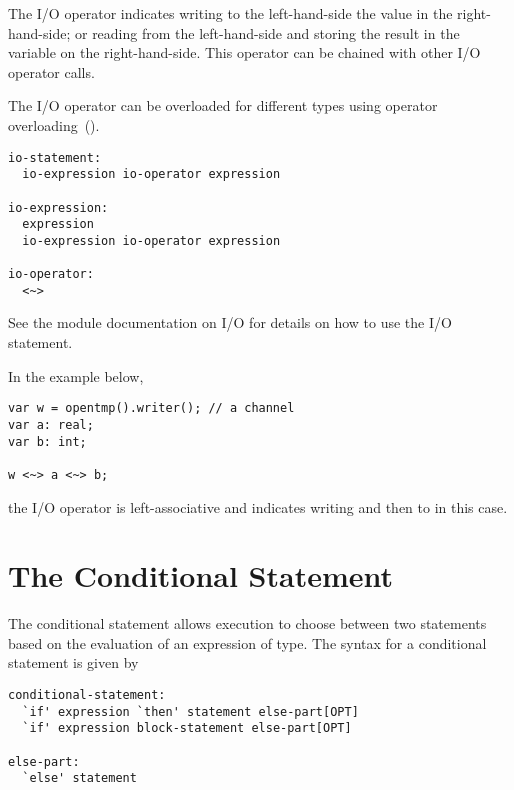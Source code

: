 The I/O operator indicates writing to the left-hand-side the value in the
right-hand-side; or reading from the left-hand-side and storing the result
in the variable on the right-hand-side. This operator can be chained with
other I/O operator calls.

The I/O operator can be overloaded for different types using operator
overloading~().
\begin{syntax}
\begin{verbatim}
io-statement:
  io-expression io-operator expression

io-expression:
  expression
  io-expression io-operator expression

io-operator:
  <~>
\end{verbatim}
\end{syntax}

See the module documentation on I/O for details on how to use the
I/O statement.

\begin{example}
In the example below,
\begin{chapel}
\begin{verbatim}
var w = opentmp().writer(); // a channel
var a: real;
var b: int;

w <~> a <~> b;
\end{verbatim}
\end{chapel}
the I/O operator is left-associative and indicates writing 
and then  to  in this case.
\end{example}


\section{The Conditional Statement}
\label{The_Conditional_Statement}

The conditional statement allows execution to choose between two
statements based on the evaluation of an expression of 
type. The syntax for a conditional statement is given by
\begin{syntax}
\begin{verbatim}
conditional-statement:
  `if' expression `then' statement else-part[OPT]
  `if' expression block-statement else-part[OPT]

else-part:
  `else' statement
\end{verbatim}
\end{syntax}

